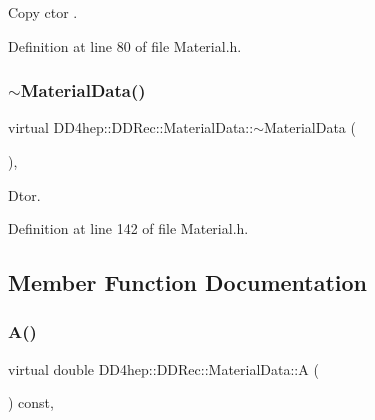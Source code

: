 Copy c\textquotesingle{}tor . 

Definition at line 80 of file Material.\+h.

\hypertarget{class_d_d4hep_1_1_d_d_rec_1_1_material_data_af8e5c9f475adfaef01379519c9e92929}{}\label{class_d_d4hep_1_1_d_d_rec_1_1_material_data_af8e5c9f475adfaef01379519c9e92929} 
\subsubsection{\texorpdfstring{$\sim$\+Material\+Data()}{~MaterialData()}}
{\footnotesize\ttfamily virtual D\+D4hep\+::\+D\+D\+Rec\+::\+Material\+Data\+::$\sim$\+Material\+Data (\begin{DoxyParamCaption}{ }\end{DoxyParamCaption})\hspace{0.3cm}{\ttfamily [inline]}, {\ttfamily [virtual]}}

D\textquotesingle{}tor. 

Definition at line 142 of file Material.\+h.



\subsection{Member Function Documentation}
\hypertarget{class_d_d4hep_1_1_d_d_rec_1_1_material_data_a34cd03ee817287d200cf55fc74cbcb54}{}\label{class_d_d4hep_1_1_d_d_rec_1_1_material_data_a34cd03ee817287d200cf55fc74cbcb54} 
\subsubsection{\texorpdfstring{A()}{A()}}
{\footnotesize\ttfamily virtual double D\+D4hep\+::\+D\+D\+Rec\+::\+Material\+Data\+::A (\begin{DoxyParamCaption}{ }\end{DoxyParamCaption}) const\hspace{0.3cm}{\ttfamily [inline]}, {\ttfamily [virtual]}}



